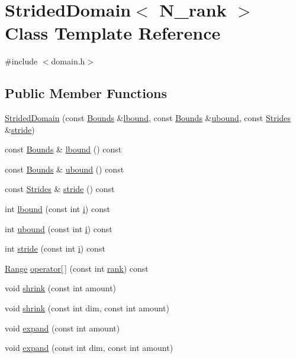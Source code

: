 \hypertarget{classStridedDomain}{}\section{Strided\+Domain$<$ N\+\_\+rank $>$ Class Template Reference}
\label{classStridedDomain}


{\ttfamily \#include $<$domain.\+h$>$}

\subsection*{Public Member Functions}
\begin{DoxyCompactItemize}
\item 
\hyperlink{classStridedDomain_a5a5c576e95b6cb110f8e66e10a1b065b}{Strided\+Domain} (const \hyperlink{classTinyVector}{Bounds} \&\hyperlink{classStridedDomain_a84b1f83635f1793af6523e92b96f17a5}{lbound}, const \hyperlink{classTinyVector}{Bounds} \&\hyperlink{classStridedDomain_aeaa3fa70694bef882329fedab3ba9cba}{ubound}, const \hyperlink{classTinyVector}{Strides} \&\hyperlink{classStridedDomain_a0fb771c7a042369eade9bfa903a3a6e2}{stride})
\item 
const \hyperlink{classTinyVector}{Bounds} \& \hyperlink{classStridedDomain_a84b1f83635f1793af6523e92b96f17a5}{lbound} () const 
\item 
const \hyperlink{classTinyVector}{Bounds} \& \hyperlink{classStridedDomain_aeaa3fa70694bef882329fedab3ba9cba}{ubound} () const 
\item 
const \hyperlink{classTinyVector}{Strides} \& \hyperlink{classStridedDomain_a0fb771c7a042369eade9bfa903a3a6e2}{stride} () const 
\item 
int \hyperlink{classStridedDomain_af763d1b527cfa4a5e74d2eb08490bfc7}{lbound} (const int \hyperlink{indexexpr_8h_aabd77643995707c185e95c8cb2782c81}{i}) const 
\item 
int \hyperlink{classStridedDomain_ab716b4cfb458b792379ffd7d4ee81041}{ubound} (const int \hyperlink{indexexpr_8h_aabd77643995707c185e95c8cb2782c81}{i}) const 
\item 
int \hyperlink{classStridedDomain_a1681bd47655fe52c8ded0345f597dcd2}{stride} (const int \hyperlink{indexexpr_8h_aabd77643995707c185e95c8cb2782c81}{i}) const 
\item 
\hyperlink{classRange}{Range} \hyperlink{classStridedDomain_ada3d3c68e2ae5613467ae4d7fd22a453}{operator\mbox{[}$\,$\mbox{]}} (const int \hyperlink{zfftnd_8c_a6cfd95afd0afebd625b889fb6e58371c}{rank}) const 
\item 
void \hyperlink{classStridedDomain_a0e3460ab88aa5e2f65112d7f1b7b1bab}{shrink} (const int amount)
\item 
void \hyperlink{classStridedDomain_ac7874f64cd0e1b8d56a32ba7f76e9948}{shrink} (const int dim, const int amount)
\item 
void \hyperlink{classStridedDomain_ae5416d13f50a20faafc0fdd723d8326c}{expand} (const int amount)
\item 
void \hyperlink{classStridedDomain_a917954118f00ec0e27b90f3bf8fb1a3c}{expand} (const int dim, const int amount)
\end{DoxyCompactItemize}


